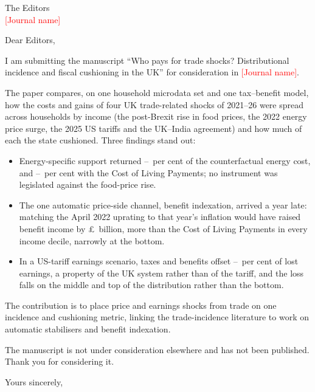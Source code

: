 \documentclass[11pt]{letter}
\date{November 2026}
\newcommand{\Journal}{\textcolor{red}{[Journal name]}}
\begin{document}
\begin{letter}{The Editors\\\Journal}
\opening{Dear Editors,}

I am submitting the manuscript ``Who pays for trade shocks?
Distributional incidence and fiscal cushioning in the UK'' for
consideration in \Journal.

The paper compares, on one household microdata set and one
tax--benefit model, how the costs and gains of four UK trade-related
shocks of 2021--26 were spread across households by income
(the post-Brexit rise in food prices, the 2022 energy price surge, the
2025 US tariffs and the UK--India agreement) and how much of each the
state cushioned. Three findings stand out:

\begin{itemize}
\item Energy-specific support returned \SsEnergySpecificRateMinPct--\SsEnergySpecificRateMaxPct\ per cent of the
counterfactual energy cost, and \SsFullRateMinPct--\SsFullRateMaxPct\ per cent with the Cost of
Living Payments; no instrument was legislated against the food-price
rise.
\item The one automatic price-side channel, benefit indexation, arrived
a year late: matching the April 2022 uprating to that year's inflation
would have raised benefit income by \pounds\SsLagReformBn\ billion, more than the
Cost of Living Payments in every income decile, narrowly at the bottom.
\item In a US-tariff earnings scenario, taxes and benefits offset
\EThreeDispTaxBenRatePct--\EThreeWageTaxBenRatePct\ per cent of lost earnings, a property of the UK system
rather than of the tariff, and the loss falls on the middle and top of
the distribution rather than the bottom.
\end{itemize}

The contribution is to place price and earnings shocks from trade on
one incidence and cushioning metric, linking the trade-incidence
literature to work on automatic stabilisers and benefit indexation.

The manuscript is not under consideration elsewhere and has not been
published. Thank you for considering it.

\closing{Yours sincerely,}
\end{letter}
\end{document}
